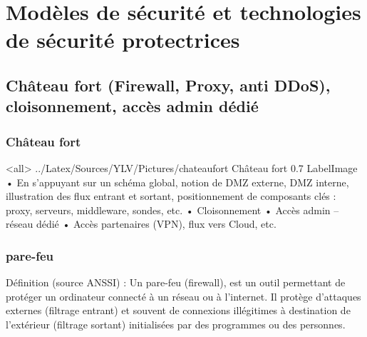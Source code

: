 \section{Modèles de sécurité et technologies de sécurité protectrices}
\subsection{Château fort (Firewall, Proxy, anti DDoS), cloisonnement, accès admin dédié}
\subsubsection{Château fort}


\mode<all>{\picframe
{../Latex/Sources/YLV/Pictures/chateaufort}%
{Château fort} %
{0.7} %
{LabelImage} %
}
•	En s’appuyant sur un schéma global, notion de DMZ externe, DMZ interne, illustration des flux entrant et sortant, positionnement de composants clés : proxy, serveurs, middleware, sondes, etc.
•	Cloisonnement
•	Accès admin – réseau dédié
•	Accès partenaires (VPN), flux vers Cloud, etc.
\subsubsection{pare-feu}
Définition (source ANSSI) :
Un pare-feu (firewall), est un outil permettant de protéger un ordinateur connecté à un réseau ou à l’internet. Il protège d’attaques externes (filtrage entrant) et souvent de connexions illégitimes à destination de l’extérieur (filtrage sortant) initialisées par des programmes ou des personnes.

